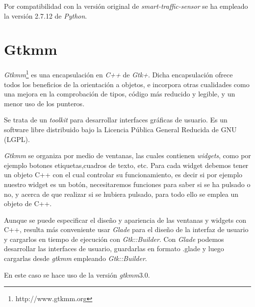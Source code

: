 Por compatibilidad con la versión original de \textit{smart-traffic-sensor} se ha empleado la versión 2.7.12 de \textit{Python}.

\section{Gtkmm}

\textit{Gtkmm}\footnote{http://www.gtkmm.org} es una encapsulación en \textit{C++} de \textit{Gtk+}. Dicha encapsulación ofrece todos los beneficios de la orientación a objetos, e incorpora otras cualidades como una mejora en la comprobación de tipos, código más reducido y legible, y un menor uso de los punteros. 

Se trata de un \textit{toolkit} para desarrollar interfaces gráficas de usuario. Es un software libre distribuido bajo la Licencia Pública General Reducida de GNU (LGPL).

\textit{Gtkmm} se organiza por medio de ventanas, las cuales contienen \textit{widgets}, como por ejemplo botones etiquetas,cuadros de texto, etc.  Para cada widget debemos tener un objeto C++ con el cual controlar su funcionamiento, es decir si por ejemplo nuestro widget es un botón, necesitaremos funciones para saber si se ha pulsado o no, y acerca de que realizar si se hubiera pulsado, para todo ello se emplea un objeto de C++. 

Aunque se puede especificar el diseño y apariencia de las ventanas y widgets con C++, resulta más conveniente usar \textit{Glade} para el diseño de la interfaz de usuario y cargarlos en tiempo de ejecución con \textit{Gtk::Builder}. Con  \textit{Glade} podemos desarrollar las interfaces de usuario, guardarlas en formato .glade y luego cargarlas desde \textit{gtkmm} empleando \textit{ Gtk::Builder}.

En este caso se hace uso de la versión \textit{gtkmm}3.0.




